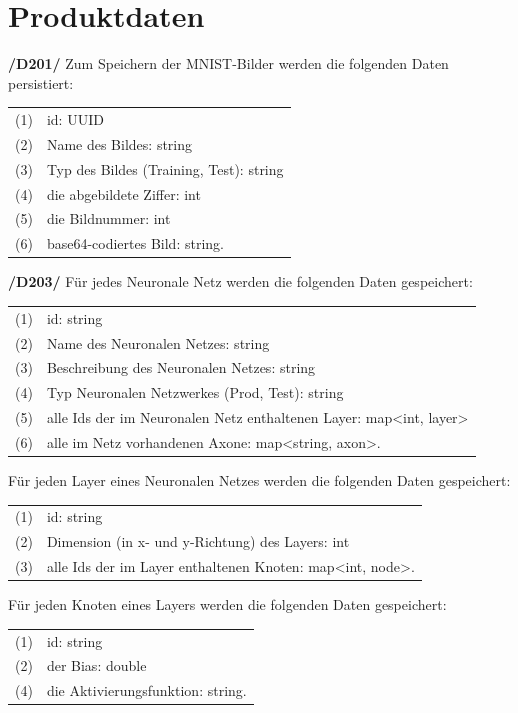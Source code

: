 \section{Produktdaten}

\textbf{/D201/} Zum Speichern der MNIST-Bilder werden die folgenden Daten persistiert:

\begin{tabular}{cl}
(1) & id: UUID \\[0.2cm]
(2) & Name des Bildes: string\\[0.2cm]
(3) & Typ des Bildes (Training, Test): string\\[0.2cm]
(4) & die abgebildete Ziffer: int\\[0.2cm]
(5) & die Bildnummer: int\\[0.2cm]
(6) & base64-codiertes Bild: string.\\[0.2cm]  
\end{tabular}

\textbf{/D203/} Für jedes Neuronale Netz werden die folgenden Daten gespeichert: 

\begin{tabular}{cl}
(1) & id: string \\[0.2cm]
(2) & Name des Neuronalen Netzes: string\\[0.2cm]
(3) & Beschreibung des Neuronalen Netzes: string\\[0.2cm]
(4) & Typ Neuronalen Netzwerkes (Prod, Test): string \\[0.2cm]
(5) & alle Ids der im Neuronalen Netz enthaltenen Layer: map<int, layer>\\[0.2cm]
(6) & alle im Netz vorhandenen Axone: map<string, axon>.\\[0.2cm]
\end{tabular}

Für jeden Layer eines Neuronalen Netzes werden die folgenden Daten gespeichert: 

\begin{tabular}{cl}
(1) & id: string \\[0.2cm]
(2) & Dimension (in x- und y-Richtung) des Layers: int \\[0.2cm]
(3) & alle Ids der im Layer enthaltenen Knoten: map<int, node>.\\[0.2cm]
\end{tabular}

Für jeden Knoten eines Layers werden die folgenden Daten gespeichert: 

\begin{tabular}{cl}
(1) & id: string \\[0.2cm]
(2) & der Bias: double \\[0.2cm]
(4) & die Aktivierungsfunktion: string.\\[0.2cm]
\end{tabular}

